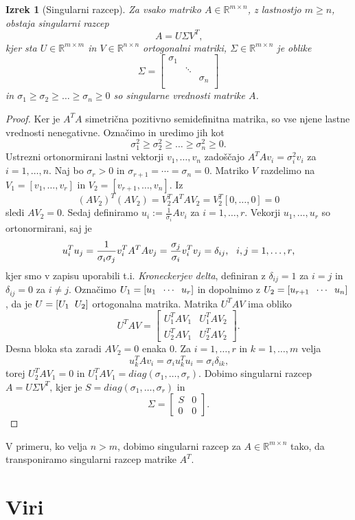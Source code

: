 \documentclass[mat1]{article}
\newtheorem{izrek}{Izrek}
\theoremstyle{definition}
\begin{document}
\begin{izrek}[Singularni razcep]
\label{izrek:SVD} Za vsako matriko $A \in \mathbb{R}^{m \times n}$, z lastnostjo $m \geq n$, obstaja singularni razcep 
$$A = U \Sigma V^T \text{,}$$
kjer sta $U \in \mathbb{R}^{m \times m}$ in $V \in \mathbb{R}^{n \times n}$ ortogonalni matriki, $\Sigma \in \mathbb{R}^{m \times n}$ je oblike
$$
\Sigma = 
\begin{bmatrix} 
\sigma_1 &  & \\
 & \ddots & \\
 & & \sigma_n  \\
 & & 
\end{bmatrix}$$
in $\sigma_1 \geq \sigma_2 \geq \ldots \geq \sigma_n \geq 0$ so singularne vrednosti matrike $A$.
\end{izrek}
\begin{proof}
Ker je $A^TA$ simetrična pozitivno semidefinitna matrika, so vse njene lastne vrednosti nenegativne. Označimo in uredimo jih kot
$$\sigma_1^2 \geq \sigma_2^2 \geq \ldots \geq \sigma_n^2 \geq 0 \text{.}$$
Ustrezni ortonormirani lastni vektorji $v_1, \ldots, v_n$ zadoščajo
$A^T A v_i = \sigma_i^2 v_i$ za $i = 1, \ldots, n \text{.}$
Naj bo $\sigma_r > 0$ in $\sigma_{r+1} = \cdots = \sigma_n = 0 \text{.}$
Matriko $V$ razdelimo na $V_1 = 
\left[ v_1, \ldots, v_r
\right]$ in $V_2 = 
\left[ v_{r+1}, \ldots, v_n
\right] \text{.}$ Iz
$$ (AV_2)^T (AV_2) = V_2^T A^T A V_2 = V_2^T \left[ 0, \ldots, 0 \right] = 0
$$
sledi $AV_2 = 0 \text{.}$ Sedaj definiramo $u_i := \frac{1}{\sigma_i} Av_i$ za $i = 1, \ldots, r \text{.}$
Vekorji $u_1, \ldots, u_r$ so ortonormirani, saj je
$$ u_i^T u_j = \frac{1}{\sigma_i \sigma_j} v_i^T A^T A v_j = \frac{\sigma_j}{\sigma_i} v_i^T v_j = \delta_{ij} \text{,} \hspace{3mm} i,j = 1, \ldots, r \text{,}
$$
kjer smo v zapisu uporabili t.i. \emph{Kroneckerjev delta}, definiran z $\delta_{ij} = 1$ za $i = j$ in $\delta_{ij} = 0$ za $i \neq j$. Označimo 
$U_1 = 
\left[ u_1 \hspace{2mm} \cdots \hspace{2mm} u_r
\right]$ in dopolnimo z $U_2 = 
\left[ u_{r+1} \hspace{2mm} \cdots \hspace{2mm} u_n
\right]$, da je $ U = \left[ U_1 \hspace{2mm} U_2 \right]$ ortogonalna matrika. Matrika $U^T A V$ ima obliko 
$$
U^T A V = 
\begin{bmatrix} 
U_1^T A V_1 & U_1^T A V_2 \\
U_2^T A V_1 & U_2^T A V_2
\end{bmatrix}
\text{.}
$$
Desna bloka sta zaradi $AV_2 = 0$ enaka $0$. Za $i = 1, \ldots, r$ in $k = 1, \ldots, m$ velja
$$ u_k^T A v_i = \sigma_i u_k^T u_i = \sigma_i \delta_{ik} \text{,}
$$
torej $U_2^T A V_1 = 0$ in $U_1^T A V_1 = diag(\sigma_1, \ldots, \sigma_r) \text{.}$ Dobimo singularni razcep $A = U \Sigma V^T \text{,}$ kjer je $S = diag(\sigma_1, \ldots, \sigma_r)$ in 
$$ \Sigma = 
\begin{bmatrix} 
S & 0 \\
0 & 0
\end{bmatrix}
\text{.}$$

\end{proof}
V primeru, ko velja $n>m$, dobimo singularni razcep za $A \in \mathbb{R}^{m \times n}$ tako, da transponiramo singularni razcep matrike $A^T$.
\section{Viri}
\end{document}
